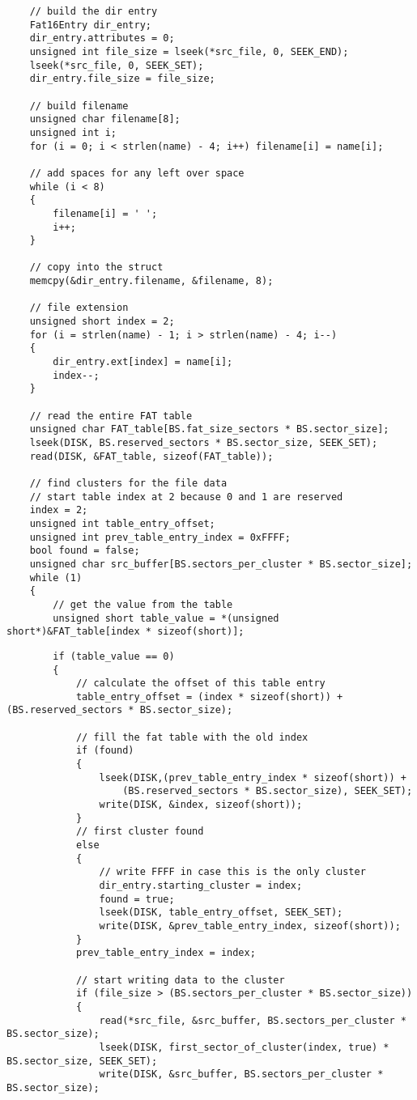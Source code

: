 \documentclass[12pt,letter,titlepage]{article}
\begin{document}
{{\begin{verbatim}
	// build the dir entry
	Fat16Entry dir_entry;
	dir_entry.attributes = 0;
	unsigned int file_size = lseek(*src_file, 0, SEEK_END);
	lseek(*src_file, 0, SEEK_SET);
	dir_entry.file_size = file_size;

	// build filename
	unsigned char filename[8];
	unsigned int i;
	for (i = 0; i < strlen(name) - 4; i++) filename[i] = name[i];

	// add spaces for any left over space
	while (i < 8) 
	{
		filename[i] = ' ';
		i++;
	}

	// copy into the struct
	memcpy(&dir_entry.filename, &filename, 8);

	// file extension
	unsigned short index = 2;
	for (i = strlen(name) - 1; i > strlen(name) - 4; i--) 
	{
		dir_entry.ext[index] = name[i];
		index--;
	}

	// read the entire FAT table
	unsigned char FAT_table[BS.fat_size_sectors * BS.sector_size];
	lseek(DISK, BS.reserved_sectors * BS.sector_size, SEEK_SET);
	read(DISK, &FAT_table, sizeof(FAT_table));

	// find clusters for the file data
	// start table index at 2 because 0 and 1 are reserved
	index = 2;
	unsigned int table_entry_offset;
	unsigned int prev_table_entry_index = 0xFFFF;
	bool found = false;
	unsigned char src_buffer[BS.sectors_per_cluster * BS.sector_size];
	while (1)
	{
		// get the value from the table
		unsigned short table_value = *(unsigned short*)&FAT_table[index * sizeof(short)];
\end{verbatim}
\pagebreak
\begin{verbatim}
		if (table_value == 0)
		{
			// calculate the offset of this table entry
			table_entry_offset = (index * sizeof(short)) + (BS.reserved_sectors * BS.sector_size);

			// fill the fat table with the old index
			if (found)
			{
				lseek(DISK,(prev_table_entry_index * sizeof(short)) + 
					(BS.reserved_sectors * BS.sector_size), SEEK_SET);
				write(DISK, &index, sizeof(short));
			}
			// first cluster found
			else
			{
				// write FFFF in case this is the only cluster
				dir_entry.starting_cluster = index;
				found = true;
				lseek(DISK, table_entry_offset, SEEK_SET);
				write(DISK, &prev_table_entry_index, sizeof(short));
			}
			prev_table_entry_index = index;

			// start writing data to the cluster
			if (file_size > (BS.sectors_per_cluster * BS.sector_size))
			{
				read(*src_file, &src_buffer, BS.sectors_per_cluster * BS.sector_size);
				lseek(DISK, first_sector_of_cluster(index, true) * BS.sector_size, SEEK_SET);
				write(DISK, &src_buffer, BS.sectors_per_cluster * BS.sector_size);


\end{verbatim}}}
\end{document}

